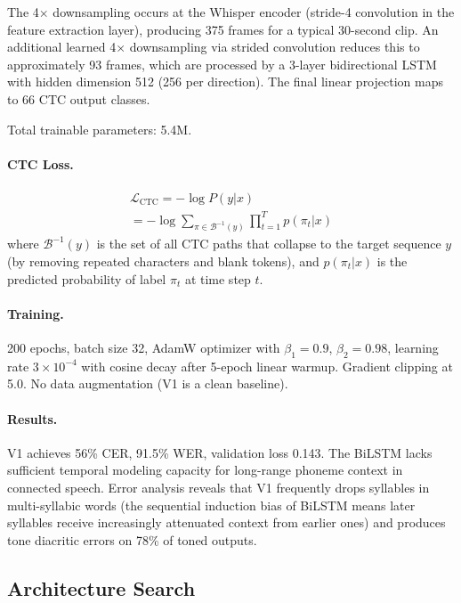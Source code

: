 \documentclass[11pt]{article}
\begin{document}
The 4$\times$ downsampling occurs at the Whisper encoder (stride-4 convolution in the feature extraction layer), producing 375 frames for a typical 30-second clip.
An additional learned 4$\times$ downsampling via strided convolution reduces this to approximately 93 frames, which are processed by a 3-layer bidirectional LSTM with hidden dimension 512 (256 per direction).
The final linear projection maps to 66 CTC output classes.

Total trainable parameters: 5.4M.

\paragraph{CTC Loss.}
\begin{multline}
\mathcal{L}_\text{CTC} = -\log P(y | x) \\
= -\log \sum_{\pi \in \mathcal{B}^{-1}(y)} \prod_{t=1}^{T} p(\pi_t | x)
\end{multline}
where $\mathcal{B}^{-1}(y)$ is the set of all CTC paths that collapse to the target sequence $y$ (by removing repeated characters and blank tokens), and $p(\pi_t | x)$ is the predicted probability of label $\pi_t$ at time step $t$.

\paragraph{Training.}
200 epochs, batch size 32, AdamW optimizer with $\beta_1{=}0.9$, $\beta_2{=}0.98$, learning rate $3 \times 10^{-4}$ with cosine decay after 5-epoch linear warmup.
Gradient clipping at 5.0.
No data augmentation (V1 is a clean baseline).

\paragraph{Results.}
V1 achieves 56\% CER, 91.5\% WER, validation loss 0.143.
The BiLSTM \cite{hochreiter1997lstm} lacks sufficient temporal modeling capacity for long-range phoneme context in connected speech.
Error analysis reveals that V1 frequently drops syllables in multi-syllabic words (the sequential induction bias of BiLSTM means later syllables receive increasingly attenuated context from earlier ones) and produces tone diacritic errors on 78\% of toned outputs.

\subsection{Architecture Search}
\label{sec:arch-search}
\end{document}

